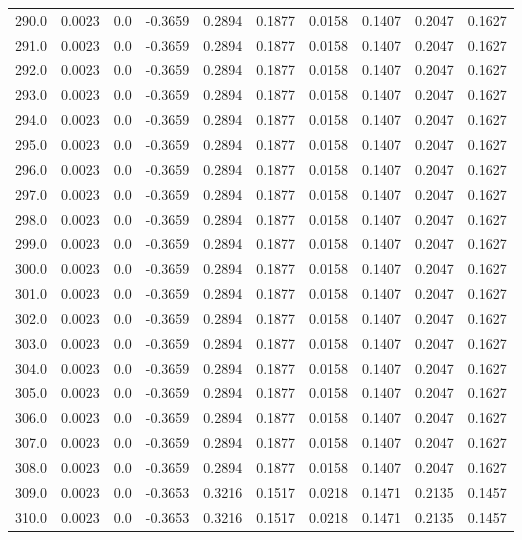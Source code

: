 \begin{longtable}{lrrrrrrrrr}
290.0 & 0.0023 & 0.0 & -0.3659 & 0.2894 & 0.1877 & 0.0158 & 0.1407 & 0.2047 & 0.1627 \\
291.0 & 0.0023 & 0.0 & -0.3659 & 0.2894 & 0.1877 & 0.0158 & 0.1407 & 0.2047 & 0.1627 \\
292.0 & 0.0023 & 0.0 & -0.3659 & 0.2894 & 0.1877 & 0.0158 & 0.1407 & 0.2047 & 0.1627 \\
293.0 & 0.0023 & 0.0 & -0.3659 & 0.2894 & 0.1877 & 0.0158 & 0.1407 & 0.2047 & 0.1627 \\
294.0 & 0.0023 & 0.0 & -0.3659 & 0.2894 & 0.1877 & 0.0158 & 0.1407 & 0.2047 & 0.1627 \\
295.0 & 0.0023 & 0.0 & -0.3659 & 0.2894 & 0.1877 & 0.0158 & 0.1407 & 0.2047 & 0.1627 \\
296.0 & 0.0023 & 0.0 & -0.3659 & 0.2894 & 0.1877 & 0.0158 & 0.1407 & 0.2047 & 0.1627 \\
297.0 & 0.0023 & 0.0 & -0.3659 & 0.2894 & 0.1877 & 0.0158 & 0.1407 & 0.2047 & 0.1627 \\
298.0 & 0.0023 & 0.0 & -0.3659 & 0.2894 & 0.1877 & 0.0158 & 0.1407 & 0.2047 & 0.1627 \\
299.0 & 0.0023 & 0.0 & -0.3659 & 0.2894 & 0.1877 & 0.0158 & 0.1407 & 0.2047 & 0.1627 \\
300.0 & 0.0023 & 0.0 & -0.3659 & 0.2894 & 0.1877 & 0.0158 & 0.1407 & 0.2047 & 0.1627 \\
301.0 & 0.0023 & 0.0 & -0.3659 & 0.2894 & 0.1877 & 0.0158 & 0.1407 & 0.2047 & 0.1627 \\
302.0 & 0.0023 & 0.0 & -0.3659 & 0.2894 & 0.1877 & 0.0158 & 0.1407 & 0.2047 & 0.1627 \\
303.0 & 0.0023 & 0.0 & -0.3659 & 0.2894 & 0.1877 & 0.0158 & 0.1407 & 0.2047 & 0.1627 \\
304.0 & 0.0023 & 0.0 & -0.3659 & 0.2894 & 0.1877 & 0.0158 & 0.1407 & 0.2047 & 0.1627 \\
305.0 & 0.0023 & 0.0 & -0.3659 & 0.2894 & 0.1877 & 0.0158 & 0.1407 & 0.2047 & 0.1627 \\
306.0 & 0.0023 & 0.0 & -0.3659 & 0.2894 & 0.1877 & 0.0158 & 0.1407 & 0.2047 & 0.1627 \\
307.0 & 0.0023 & 0.0 & -0.3659 & 0.2894 & 0.1877 & 0.0158 & 0.1407 & 0.2047 & 0.1627 \\
308.0 & 0.0023 & 0.0 & -0.3659 & 0.2894 & 0.1877 & 0.0158 & 0.1407 & 0.2047 & 0.1627 \\
309.0 & 0.0023 & 0.0 & -0.3653 & 0.3216 & 0.1517 & 0.0218 & 0.1471 & 0.2135 & 0.1457 \\
310.0 & 0.0023 & 0.0 & -0.3653 & 0.3216 & 0.1517 & 0.0218 & 0.1471 & 0.2135 & 0.1457 \\

\end{longtable}
